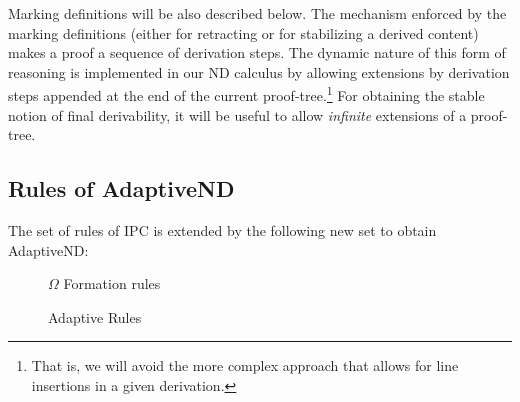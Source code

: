 \documentclass[]{article}
\newcommand{\Turn}[2]
	{ {#1}\vdash_{\textbf{\sf s}}  {#2}}
\newcommand{\TurnNext}[2]
	{ {#1}\vdash_{\textbf{\sf s+1}}  {#2}}
\newcommand{\TurnNextNext}[2]
	{ {#1}\vdash_{\textbf{\sf s+2}}  {#2}}
\begin{document}
Marking definitions will be also described below. The mechanism enforced by the marking definitions (either for retracting or for stabilizing a derived content) makes a proof a sequence of derivation steps. The dynamic nature of this form of reasoning is implemented in our ND calculus by allowing extensions by derivation steps appended at the end of the current proof-tree.\footnote{That is, we will avoid the more complex approach that allows for line insertions in a given derivation.} For obtaining the stable notion of final derivability, it will be useful to allow \textit{infinite} extensions of a proof-tree.

\subsection{Rules of {\sf AdaptiveND}}

The set of rules of {\sf IPC} is extended by the following new set to obtain {\sf AdaptiveND}:

\begin{figure}[h!]
\caption{$\Omega$ Formation rules}
\end{figure}





\begin{figure}[h!]

\caption{Adaptive Rules}
\end{figure}
\end{document}
